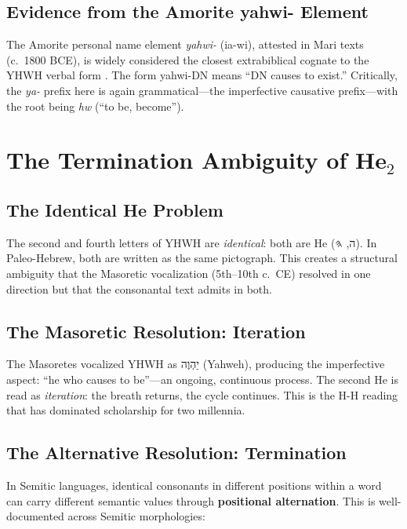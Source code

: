 \documentclass[12pt]{article}
\begin{document}
\subsection{Evidence from the Amorite yahwi- Element}

The Amorite personal name element \textit{yahwi-} (ia-wi), attested in Mari texts (c.\ 1800 BCE), is widely considered the closest extrabiblical cognate to the YHWH verbal form \cite{cross1973, lewis2020}. The form yahwi-DN means ``DN causes to exist.'' Critically, the \textit{ya-} prefix here is again grammatical---the imperfective causative prefix---with the root being \textit{hw} (``to be, become'').

\section{The Termination Ambiguity of He$_2$}

\subsection{The Identical He Problem}

The second and fourth letters of YHWH are \textit{identical}: both are He (ה, 𐤄). In Paleo-Hebrew, both are written as the same pictograph. This creates a structural ambiguity that the Masoretic vocalization (5th--10th c.\ CE) resolved in one direction but that the consonantal text admits in both.

\subsection{The Masoretic Resolution: Iteration}

The Masoretes vocalized YHWH as יַהְוֶה (Yahweh), producing the imperfective aspect: ``he who causes to be''---an ongoing, continuous process. The second He is read as \textit{iteration}: the breath returns, the cycle continues. This is the H-H reading that has dominated scholarship for two millennia.

\subsection{The Alternative Resolution: Termination}

In Semitic languages, identical consonants in different positions within a word can carry different semantic values through \textbf{positional alternation}. This is well-documented across Semitic morphologies:
\end{document}
